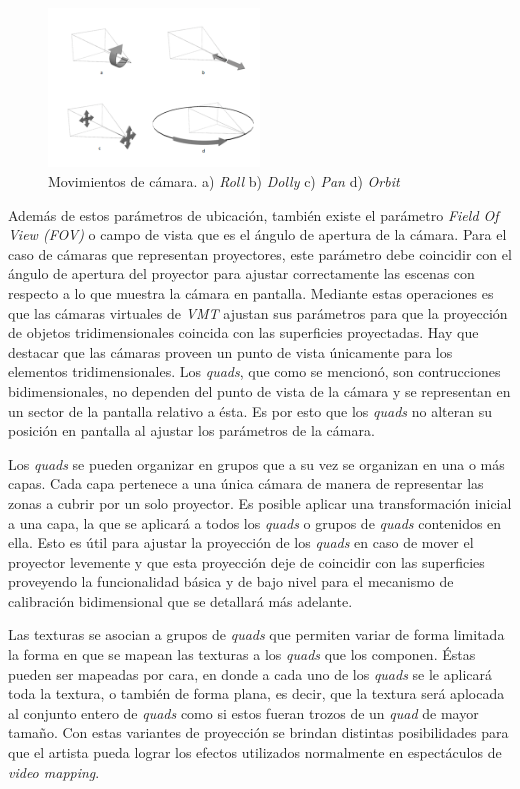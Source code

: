 \begin{figure}[H]
  \centering
    \includegraphics[width=0.5\textwidth]{./Cap5_vmt/vmtengine-cameramove.png}
  \caption{Movimientos de cámara. a) \emph{Roll} b) \emph{Dolly} c) \emph{Pan} d) \emph{Orbit}}%
  \label{fig:VMT-CameraMove}
\end{figure}

Además de estos parámetros de ubicación, también existe el parámetro \emph{Field Of View (FOV)} o campo de vista que es el ángulo de apertura de la cámara. Para el caso de cámaras que representan proyectores, este parámetro debe coincidir con el ángulo de apertura del proyector para ajustar correctamente las escenas con respecto a lo que muestra la cámara en pantalla.
Mediante estas operaciones es que las cámaras virtuales de \emph{VMT} ajustan sus parámetros para que la proyección de objetos tridimensionales coincida con las superficies proyectadas.
Hay que destacar que las cámaras proveen un punto de vista únicamente para los elementos tridimensionales. Los \emph{quads}, que como se mencionó, son contrucciones bidimensionales, no dependen del punto de vista de la cámara y se representan en un sector de la pantalla relativo a ésta. Es por esto que los \emph{quads} no alteran su posición en pantalla al ajustar los parámetros de la cámara.

Los \emph{quads} se pueden organizar en grupos que a su vez se organizan en una o más capas. Cada capa pertenece a una única cámara de manera de representar las zonas a cubrir por un solo proyector. Es posible aplicar una transformación inicial a una capa, la que se aplicará a todos los \emph{quads} o grupos de \emph{quads} contenidos en ella. Esto es útil para ajustar la proyección de los \emph{quads} en caso de mover el proyector levemente y que esta proyección deje de coincidir con las superficies proveyendo la funcionalidad básica y de bajo nivel para el mecanismo de calibración bidimensional que se detallará más adelante.

Las texturas se asocian a grupos de \emph{quads} que permiten variar de forma limitada la forma en que se mapean las texturas a los \emph{quads} que los componen. Éstas pueden ser mapeadas por cara, en donde a cada uno de los \emph{quads} se le aplicará toda la textura, o también de forma plana, es decir, que la textura será aplocada al conjunto entero de \emph{quads} como si estos fueran trozos de un \emph{quad} de mayor tamaño.
Con estas variantes de proyección se brindan distintas posibilidades para que el artista pueda lograr los efectos utilizados normalmente en espectáculos de \emph{video mapping}.

